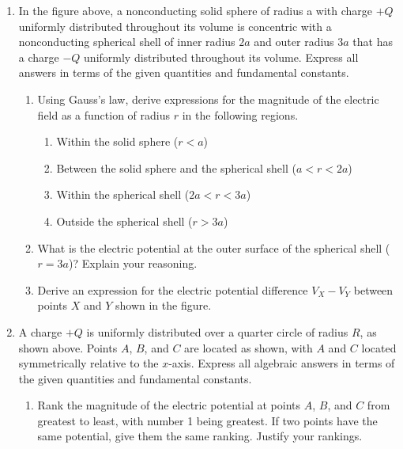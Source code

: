 \documentclass{../../../oss-apphys}
\begin{document}
\begin{multicols}{2}
\begin{enumerate}[leftmargin=18pt,resume]
  \end{enumerate}
\end{multicols}
\newpage


\genfreedirections

\begin{enumerate}
\item In the figure above, a nonconducting solid sphere of radius a with charge
  $+Q$ uniformly distributed throughout its volume is concentric with a
  nonconducting spherical shell of inner radius $2a$ and outer radius $3a$ that
  has a charge $-Q$ uniformly distributed throughout its volume. Express all
  answers in terms of the given quantities and fundamental constants.
  \begin{enumerate}
  \item Using Gauss's law, derive expressions for the magnitude of the
    electric field as a function of radius $r$ in the following regions.
    \begin{enumerate}
    \item Within the solid sphere ($r<a$)
    \item Between the solid sphere and the spherical shell ($a<r<2a$)
    \item Within the spherical shell ($2a<r<3a$)
    \item Outside the spherical shell ($r>3a$)
    \end{enumerate}
  \item What is the electric potential at the outer surface of the spherical
    shell ($r=3a$)? Explain your reasoning.
  \item Derive an expression for the electric potential difference $V_X-V_Y$
    between points $X$ and $Y$ shown in the figure.
  \end{enumerate}
  \newpage

\item A charge $+Q$ is uniformly distributed over a quarter circle of radius
  $R$, as shown above. Points $A$, $B$, and $C$ are located as shown, with $A$
  and $C$ located symmetrically relative to the $x$-axis. Express all algebraic
  answers in terms of the given quantities and fundamental constants.
  \begin{enumerate}
  \item Rank the magnitude of the electric potential at points $A$, $B$, and $C$
    from greatest to least, with number 1 being greatest. If two points have
    the same potential, give them the same ranking. Justify your rankings.


\end{enumerate}
\end{enumerate}
\end{document}
